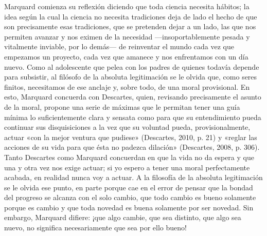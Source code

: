 \begin{refsection}
Marquard comienza su reflexión diciendo que toda ciencia necesita hábitos; la idea según la cual la ciencia no necesita tradiciones deja de lado el hecho de que son precisamente esas tradiciones, que se pretenden dejar a un lado, las que nos permiten avanzar y nos eximen de la necesidad ---insoportablemente pesada y vitalmente inviable, por lo demás--- de reinventar el mundo cada vez que empezamos un proyecto, cada vez que amanece y nos enfrentamos con un día nuevo. Como al adolescente que pelea con los padres de quienes todavía depende para subsistir, al filósofo de la absoluta legitimación se le olvida que, como seres finitos, necesitamos de ese anclaje y, sobre todo, de una moral provisional. En esto, Marquard concuerda con Descartes, quien, revisando precisamente el asunto de la moral, propone una serie de máximas que le permitan tener una guía mínima lo suficientemente clara y sensata como para que su entendimiento pueda continuar sus disquisiciones a la vez que su voluntad pueda, provisionalmente, actuar «con la mejor ventura que pudiese» (Descartes, 2010, p. 21) y «reglar las acciones de su vida para que ésta no padezca dilación» (Descartes, 2008, p. 306). Tanto Descartes como Marquard concuerdan en que la vida no da espera y que una y otra vez nos exige actuar; si yo espero a tener una moral perfectamente acabada\emph{,} en realidad nunca voy a actuar. A la filosofía de la absoluta legitimación se le olvida ese punto, en parte porque cae en el error de pensar que la bondad del progreso se alcanza con el solo cambio, que todo cambio es bueno solamente porque es cambio y que toda novedad es buena solamente por ser novedad. Sin embargo, Marquard difiere: ¡que algo cambie, que sea distinto, que algo sea nuevo, no significa necesariamente que sea por ello bueno!


\end{refsection}
